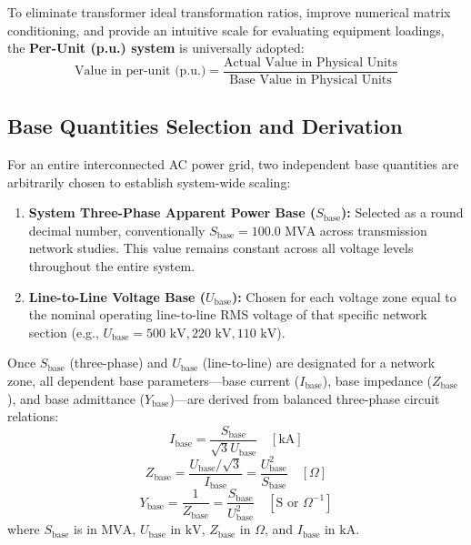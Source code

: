 \documentclass[12pt,a4paper,oneside]{report}
\begin{document}
To eliminate transformer ideal transformation ratios, improve numerical matrix conditioning, and provide an intuitive scale for evaluating equipment loadings, the \textbf{Per-Unit (p.u.) system} is universally adopted:
\begin{equation}
\text{Value in per-unit (p.u.)} = \frac{\text{Actual Value in Physical Units}}{\text{Base Value in Physical Units}}
\end{equation}

\subsection{Base Quantities Selection and Derivation}
For an entire interconnected AC power grid, two independent base quantities are arbitrarily chosen to establish system-wide scaling:
\begin{enumerate}
    \item \textbf{System Three-Phase Apparent Power Base ($S_{\text{base}}$):} Selected as a round decimal number, conventionally $S_{\text{base}} = 100.0\text{ MVA}$ across transmission network studies. This value remains constant across all voltage levels throughout the entire system.
    \item \textbf{Line-to-Line Voltage Base ($U_{\text{base}}$):} Chosen for each voltage zone equal to the nominal operating line-to-line RMS voltage of that specific network section (e.g., $U_{\text{base}} = 500\text{ kV}, 220\text{ kV}, 110\text{ kV}$).
\end{enumerate}

Once $S_{\text{base}}$ (three-phase) and $U_{\text{base}}$ (line-to-line) are designated for a network zone, all dependent base parameters---base current ($I_{\text{base}}$), base impedance ($Z_{\text{base}}$), and base admittance ($Y_{\text{base}}$)---are derived from balanced three-phase circuit relations:
\begin{equation}
I_{\text{base}} = \frac{S_{\text{base}}}{\sqrt{3} U_{\text{base}}} \quad [\text{kA}]
\end{equation}
\begin{equation}
Z_{\text{base}} = \frac{U_{\text{base}} / \sqrt{3}}{I_{\text{base}}} = \frac{U_{\text{base}}^2}{S_{\text{base}}} \quad [\Omega]
\end{equation}
\begin{equation}
Y_{\text{base}} = \frac{1}{Z_{\text{base}}} = \frac{S_{\text{base}}}{U_{\text{base}}^2} \quad [\text{S} \text{ or } \Omega^{-1}]
\end{equation}
where $S_{\text{base}}$ is in $\text{MVA}$, $U_{\text{base}}$ in $\text{kV}$, $Z_{\text{base}}$ in $\Omega$, and $I_{\text{base}}$ in $\text{kA}$.
\end{document}
